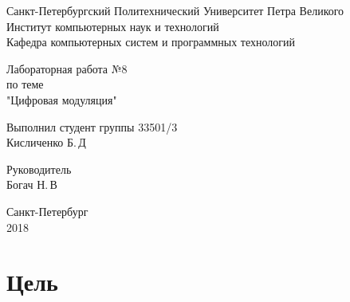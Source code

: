 \documentclass[12pt,a4paper]{scrartcl}
\begin{document}
\begin{titlepage}
  \begin{center}
    Санкт-Петербургский Политехнический Университет     Петра Великого \\
    
    Институт компьютерных наук и технологий \\
    
    Кафедра компьютерных систем и программных технологий
  \end{center}
  
  \vfill
  
  \begin{center}
  Лабораторная работа №8\\
  по теме\\
  "Цифровая модуляция"\\
\end{center}

\vfill

\newlength{\ML}
\hfill\begin{minipage}{0.4\textwidth}
  Выполнил студент группы 33501/3\\
  \underline{\hspace{\ML}} Кисличенко Б.\,Д\\
\end{minipage}%

\bigskip

\hfill\begin{minipage}{0.4\textwidth}
  Руководитель\\
  \underline{\hspace{\ML}} Богач Н.\,В\\
\end{minipage}%

\vfill
 
\begin{center}
  Санкт-Петербург\\
2018 
\end{center}

\end{titlepage}

\section{Цель}
\label{sec:goal}
\end{document}
